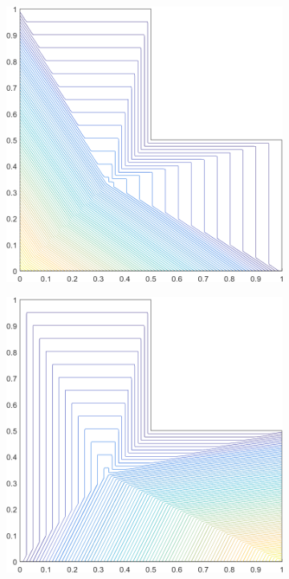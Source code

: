 \begin{figure}
\begin{subfigure}[b]{0.39\textwidth}
		\caption{}
	\end{subfigure}
	\vfill
	\begin{subfigure}[b]{0.39\textwidth}
		\centering
		\includegraphics[width=\textwidth]{figures/sec_BF/L-domain_PWLD1_contour_b1.png}
		\caption{}
	\end{subfigure}
	\hspace{1.5cm}
	\begin{subfigure}[b]{0.39\textwidth}
		\centering
		\includegraphics[width=\textwidth]{figures/sec_BF/L-domain_PWLD1_contour_b2.png}

\end{subfigure}
\end{figure}
